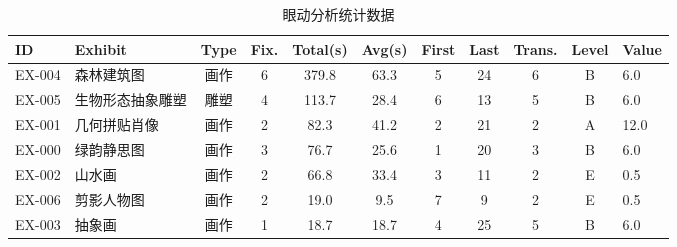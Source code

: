 \begin{table}[h]
\centering
\caption{眼动分析统计数据}
\label{tab:gaze_stats}
\begin{tabular}{l|l|c|c|c|c|c|c|c|c}
\hline
\textbf{ID} & \textbf{Exhibit} & \textbf{Type} & \textbf{Fix.} & \textbf{Total(s)} & \textbf{Avg(s)} & \textbf{First} & \textbf{Last} & \textbf{Trans.} & \textbf{Level} & \textbf{Value} \\
\hline
EX-004 & 森林建筑图 & 画作 & 6 & 379.8 & 63.3 & 5 & 24 & 6 & B & 6.0 \\
EX-005 & 生物形态抽象雕塑 & 雕塑 & 4 & 113.7 & 28.4 & 6 & 13 & 5 & B & 6.0 \\
EX-001 & 几何拼贴肖像 & 画作 & 2 & 82.3 & 41.2 & 2 & 21 & 2 & A & 12.0 \\
EX-000 & 绿韵静思图 & 画作 & 3 & 76.7 & 25.6 & 1 & 20 & 3 & B & 6.0 \\
EX-002 & 山水画 & 画作 & 2 & 66.8 & 33.4 & 3 & 11 & 2 & E & 0.5 \\
EX-006 & 剪影人物图 & 画作 & 2 & 19.0 & 9.5 & 7 & 9 & 2 & E & 0.5 \\
EX-003 & 抽象画 & 画作 & 1 & 18.7 & 18.7 & 4 & 25 & 5 & B & 6.0 \\
\hline
\end{tabular}
\end{table}
